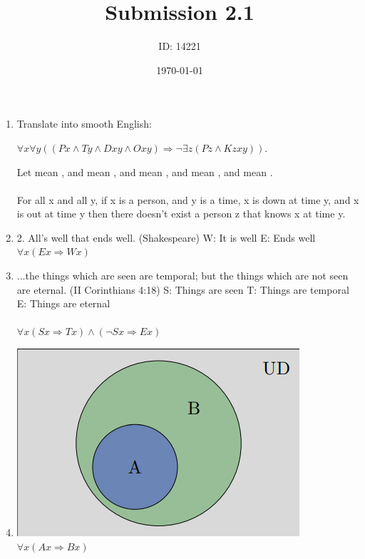 \documentclass[]{article}
\date{\today}
\author{ID: 14221}
\title{Submission 2.1}
\begin{document}
\maketitle

\begin{enumerate}
    \item Translate into smooth English:
    \begin{center}
        $\forall x \forall y((Px \land Ty \land Dxy \land Oxy)\Rightarrow \neg \exists z(Pz \land Kzxy)).$
    \end{center}
    Let  mean , and  mean , and  mean , and  mean , and  mean .
    \\\\ For all x and all y, if x is a person, and y is a time, x is down at time y, and x is out at time y then there doesn't exist a person z that knows x at time y.
    
    
    \item 2. All’s well that ends well. (Shakespeare)
    \newline W: It is well
    \newline E: Ends well
    \newline $\forall x (Ex \Rightarrow Wx)$
    
    
    

    \item ...the things which are seen are temporal; but the things which are not seen are eternal. (II Corinthians 4:18)
    \newline S: Things are seen
    \newline T: Things are temporal
    \newline E: Things are eternal
    \\\\ $\forall x (Sx \Rightarrow Tx) \land (\neg Sx \Rightarrow Ex)$
    
    \item  \includegraphics[scale=0.5]{Sub2.1Q4.png}
    \newline $\forall x(Ax \Rightarrow Bx)$
    

\end{enumerate}
\end{document}
